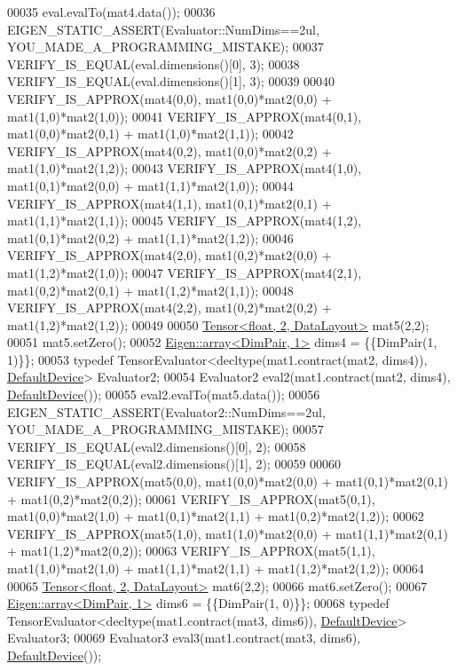 \begin{DoxyCode}
00035   eval.evalTo(mat4.data());
00036   EIGEN\_STATIC\_ASSERT(Evaluator::NumDims==2ul, YOU\_MADE\_A\_PROGRAMMING\_MISTAKE);
00037   VERIFY\_IS\_EQUAL(eval.dimensions()[0], 3);
00038   VERIFY\_IS\_EQUAL(eval.dimensions()[1], 3);
00039 
00040   VERIFY\_IS\_APPROX(mat4(0,0), mat1(0,0)*mat2(0,0) + mat1(1,0)*mat2(1,0));
00041   VERIFY\_IS\_APPROX(mat4(0,1), mat1(0,0)*mat2(0,1) + mat1(1,0)*mat2(1,1));
00042   VERIFY\_IS\_APPROX(mat4(0,2), mat1(0,0)*mat2(0,2) + mat1(1,0)*mat2(1,2));
00043   VERIFY\_IS\_APPROX(mat4(1,0), mat1(0,1)*mat2(0,0) + mat1(1,1)*mat2(1,0));
00044   VERIFY\_IS\_APPROX(mat4(1,1), mat1(0,1)*mat2(0,1) + mat1(1,1)*mat2(1,1));
00045   VERIFY\_IS\_APPROX(mat4(1,2), mat1(0,1)*mat2(0,2) + mat1(1,1)*mat2(1,2));
00046   VERIFY\_IS\_APPROX(mat4(2,0), mat1(0,2)*mat2(0,0) + mat1(1,2)*mat2(1,0));
00047   VERIFY\_IS\_APPROX(mat4(2,1), mat1(0,2)*mat2(0,1) + mat1(1,2)*mat2(1,1));
00048   VERIFY\_IS\_APPROX(mat4(2,2), mat1(0,2)*mat2(0,2) + mat1(1,2)*mat2(1,2));
00049 
00050   \hyperlink{class_eigen_1_1_tensor}{Tensor<float, 2, DataLayout>} mat5(2,2);
00051   mat5.setZero();
00052   \hyperlink{class_eigen_1_1array}{Eigen::array<DimPair, 1>} dims4 = \{\{DimPair(1, 1)\}\};
00053   \textcolor{keyword}{typedef} TensorEvaluator<decltype(mat1.contract(mat2, dims4)), \hyperlink{struct_eigen_1_1_default_device}{DefaultDevice}> Evaluator2;
00054   Evaluator2 eval2(mat1.contract(mat2, dims4), \hyperlink{struct_eigen_1_1_default_device}{DefaultDevice}());
00055   eval2.evalTo(mat5.data());
00056   EIGEN\_STATIC\_ASSERT(Evaluator2::NumDims==2ul, YOU\_MADE\_A\_PROGRAMMING\_MISTAKE);
00057   VERIFY\_IS\_EQUAL(eval2.dimensions()[0], 2);
00058   VERIFY\_IS\_EQUAL(eval2.dimensions()[1], 2);
00059 
00060   VERIFY\_IS\_APPROX(mat5(0,0), mat1(0,0)*mat2(0,0) + mat1(0,1)*mat2(0,1) + mat1(0,2)*mat2(0,2));
00061   VERIFY\_IS\_APPROX(mat5(0,1), mat1(0,0)*mat2(1,0) + mat1(0,1)*mat2(1,1) + mat1(0,2)*mat2(1,2));
00062   VERIFY\_IS\_APPROX(mat5(1,0), mat1(1,0)*mat2(0,0) + mat1(1,1)*mat2(0,1) + mat1(1,2)*mat2(0,2));
00063   VERIFY\_IS\_APPROX(mat5(1,1), mat1(1,0)*mat2(1,0) + mat1(1,1)*mat2(1,1) + mat1(1,2)*mat2(1,2));
00064 
00065   \hyperlink{class_eigen_1_1_tensor}{Tensor<float, 2, DataLayout>} mat6(2,2);
00066   mat6.setZero();
00067   \hyperlink{class_eigen_1_1array}{Eigen::array<DimPair, 1>} dims6 = \{\{DimPair(1, 0)\}\};
00068   \textcolor{keyword}{typedef} TensorEvaluator<decltype(mat1.contract(mat3, dims6)), \hyperlink{struct_eigen_1_1_default_device}{DefaultDevice}> Evaluator3;
00069   Evaluator3 eval3(mat1.contract(mat3, dims6), \hyperlink{struct_eigen_1_1_default_device}{DefaultDevice}());

\end{DoxyCode}
